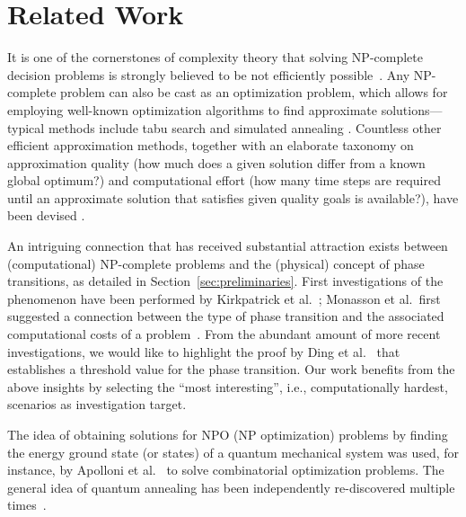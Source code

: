 \section{Related Work}
\label{sec:related-work}

It is one of the cornerstones of complexity theory that solving NP-complete decision problems is strongly believed to be not efficiently possible~\cite{cook1971complexity,murty1987some}. Any NP-complete problem can also be cast as an optimization problem, which allows for employing well-known optimization algorithms to find approximate solutions---typical methods include tabu search \cite{glover2013tabu,gendreau1994tabu} and simulated annealing \cite{kirkpatrick1983optimization,chen1995chaotic}. Countless other efficient approximation methods, together with an elaborate taxonomy on approximation quality (how much does a given solution differ from a known global optimum?) and computational effort (how many time steps are required until an approximate solution that satisfies given quality goals is available?), have been devised \cite{Ausiello1999}.


An intriguing connection that has received substantial attraction exists between (computational) NP-complete problems and the (physical) concept of phase transitions, as detailed in Section~\ref{sec:preliminaries}. First investigations of the phenomenon have been performed by Kirkpatrick et al.~\cite{kirkpatrick1994critical}; Monasson et al.\ first suggested a connection between the type of phase transition and the associated computational costs of a problem~\cite{monasson1999determining}. From the abundant amount of more recent investigations, we would like to highlight the proof by Ding et al.~\cite{ding2015proof} that establishes a threshold value for the phase transition. Our work benefits from the above insights by selecting the ``most interesting'', i.e., computationally hardest, scenarios as investigation target.

The idea of obtaining solutions for NPO (NP optimization) problems by finding the energy ground state (or states) of a quantum mechanical system was used, for instance, by Apolloni et al.~\cite{apolloni1989quantum,apolloni1988numerical} to solve combinatorial optimization problems. The general idea of quantum annealing has been independently re-discovered multiple times~\cite{albash2016adiabatic,finnila1994quantum,amara1993global,kadowaki1998quantum}.

